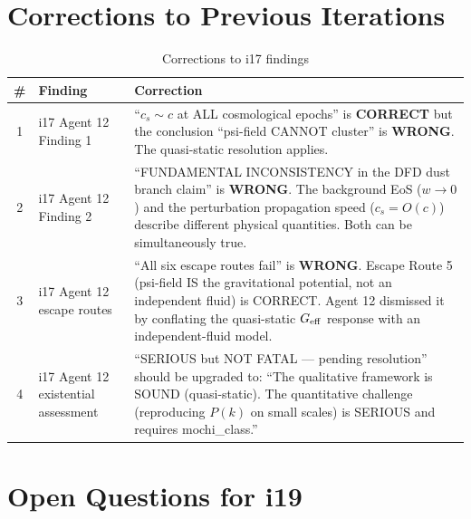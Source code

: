 \documentclass[11pt]{article}
\begin{document}
\section*{Corrections to Previous Iterations}

\begin{table}[H]
\centering
\caption{Corrections to i17 findings}
\begin{tabular}{clp{9cm}}
\toprule
\# & Finding & Correction \\
\midrule
1 & i17 Agent 12 Finding 1 & ``$c_s \sim c$ at ALL cosmological epochs''
  is \textbf{CORRECT} but the conclusion ``psi-field CANNOT cluster''
  is \textbf{WRONG}. The quasi-static resolution applies. \\
2 & i17 Agent 12 Finding 2 & ``FUNDAMENTAL INCONSISTENCY in the DFD dust
  branch claim'' is \textbf{WRONG}. The background EoS ($w \to 0$) and
  the perturbation propagation speed ($c_s = O(c)$) describe different
  physical quantities. Both can be simultaneously true. \\
3 & i17 Agent 12 escape routes & ``All six escape routes fail'' is
  \textbf{WRONG}. Escape Route 5 (psi-field IS the gravitational
  potential, not an independent fluid) is CORRECT. Agent 12 dismissed
  it by conflating the quasi-static $G_{\rm eff}$ response with an
  independent-fluid model. \\
4 & i17 Agent 12 existential assessment & ``SERIOUS but NOT FATAL ---
  pending resolution'' should be upgraded to: ``The qualitative
  framework is SOUND (quasi-static). The quantitative challenge
  (reproducing $P(k)$ on small scales) is SERIOUS and requires
  mochi\_class.'' \\
\bottomrule
\end{tabular}
\end{table}


\section*{Open Questions for i19}
\end{document}
